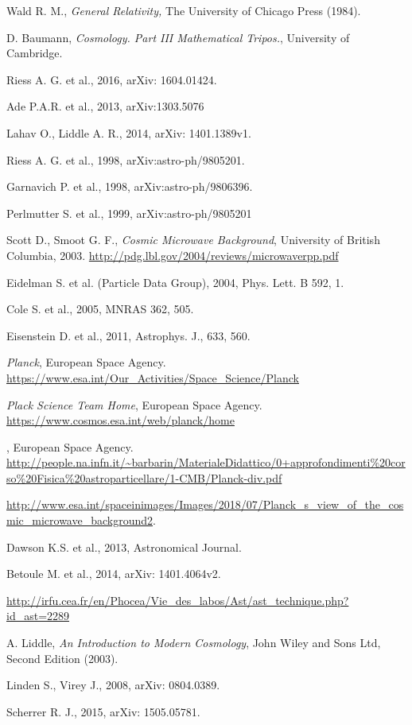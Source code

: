 \documentclass[onecolumn,           %
               showpacs,            %
               preprintnumbers,     %
               aps,                 %
               prl,          	    %
               letterpaper,             %
               superscriptaddress,      %
               nofootinbib,         %
               tightenlines,        %
               floats,floatfix      %
               ,usenatbib,
               ]{revtex4-1}
\begin{document}
\begin{thebibliography}{9}
 Wald R. M., \textit{General Relativity,} The University of Chicago Press (1984).

 D. Baumann, {\em Cosmology. Part III Mathematical Tripos.}, University of Cambridge.

 Riess A. G. et al., 2016, arXiv: 1604.01424.

 Ade P.A.R. et al., 2013, arXiv:1303.5076

 Lahav O., Liddle A. R., 2014, arXiv: 1401.1389v1.

 Riess A. G. et al., 1998, 	arXiv:astro-ph/9805201.

 Garnavich P. et al., 1998, arXiv:astro-ph/9806396. 

 Perlmutter S. et al., 1999, arXiv:astro-ph/9805201

 Scott D.,  Smoot G. F., {\em Cosmic Microwave Background}, University of British Columbia, 2003. \url{http://pdg.lbl.gov/2004/reviews/microwaverpp.pdf} 

 Eidelman S. et al. (Particle Data Group), 2004, Phys. Lett. B 592, 1.

 Cole S. et al., 2005, MNRAS 362, 505.

 Eisenstein D. et al., 2011, Astrophys. J., 633, 560.

 {\em Planck}, European Space Agency. \url{https://www.esa.int/Our_Activities/Space_Science/Planck}

 {\em Plack Science Team Home}, European Space Agency. \url{https://www.cosmos.esa.int/web/planck/home}

, European Space Agency. \url{http://people.na.infn.it/~barbarin/MaterialeDidattico/0+approfondimenti%20corso%20Fisica%20astroparticellare/1-CMB/Planck-div.pdf}
	
\url{http://www.esa.int/spaceinimages/Images/2018/07/Planck_s_view_of_the_cosmic_microwave_background2}.

 Dawson K.S. et al., 2013, Astronomical Journal.

 Betoule M. et al., 2014, arXiv: 1401.4064v2.

 \url{http://irfu.cea.fr/en/Phocea/Vie_des_labos/Ast/ast_technique.php?id_ast=2289}

 A. Liddle, {\em An Introduction to Modern Cosmology}, John Wiley and Sons Ltd, Second Edition (2003).

 Linden S., Virey J., 2008, arXiv: 0804.0389.

 Scherrer R. J., 2015, arXiv: 1505.05781.

\end{thebibliography}
\end{document}
